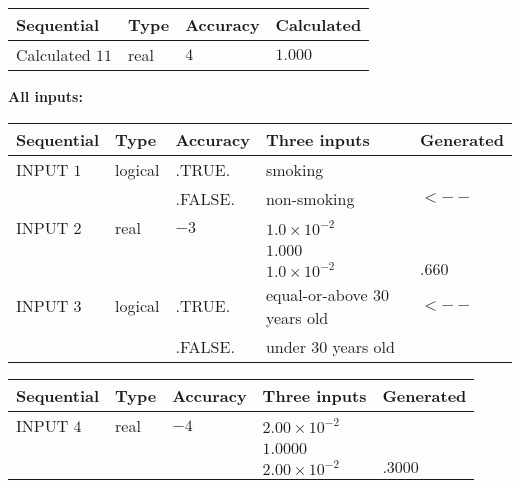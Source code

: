 \documentclass[12pt]{article}
\begin{document}
   
  
  
\noindent\begin{tabular}{|l|l|l|l|}
\hline
 Sequential & Type & Accuracy & Calculated \\ 
\hline
 
 
  Calculated $          11$ & real & $           4 $ & 
 $ 1.000 $ 
 \\  \hline  
 \end{tabular}
   
   
   
   
\noindent\vspace{0.1in}\hspace{-0.08in} {\textbf{\Large{All inputs: }}}
   
   
  
  
\noindent\begin{tabular}{|l|l|l|l|l|}
\hline
 Sequential & Type & Accuracy & Three inputs & Generated \\ 
\hline
 
 
  INPUT $           1$ & logical & .TRUE. & 
 smoking & 
  \\
  & & .FALSE. & 
  non-smoking & 
  $ <-- $ 
 \\  \hline  
 
 
  INPUT $           2$ & real & $          -3 $ & $
 1.0 \times 10^{-2}
  $ & \\
  & & &  $
 1.000
  $ & \\
  & & &  $
 1.0 \times 10^{-2}
 $ & $ .660 $ 
 \\  \hline  
 
 
  INPUT $           3$ & logical & .TRUE. & 
 equal-or-above 30 years old & 
  $ <-- $ 
  \\
  & & .FALSE. & 
  under 30 years old & 
 \\  \hline  
 \end{tabular}
   
   
  
  
\noindent\begin{tabular}{|l|l|l|l|l|}
\hline
 Sequential & Type & Accuracy & Three inputs & Generated \\ 
\hline
 
 
  INPUT $           4$ & real & $          -4 $ & $
 2.00 \times 10^{-2}
  $ & \\
  & & &  $
 1.0000
  $ & \\
  & & &  $
 2.00 \times 10^{-2}
 $ & $ .3000 $ 
 \\  \hline  
 \end{tabular}
   
\end{document}
